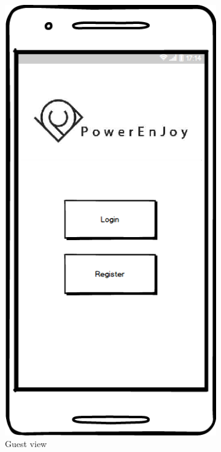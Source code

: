 	\begin{figure}[h]
 
		\begin{subfigure}{0.5\textwidth}
			\includegraphics[scale=0.35]{img/mockups/App_guest.png}
			\caption{Guest view}
			\label{fig:subim1}
		\end{subfigure}
		\begin{subfigure}{0.5\textwidth}

\end{subfigure}
\end{figure}
